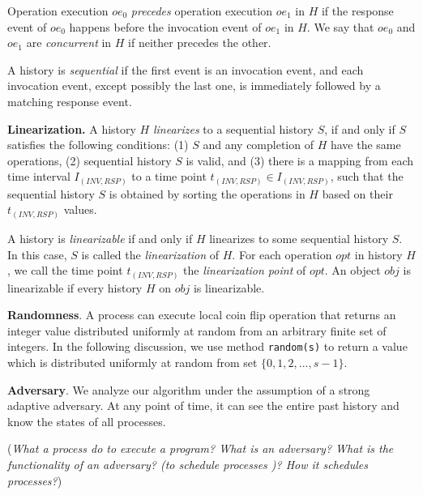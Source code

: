 Operation execution $oe_0$ \emph{precedes} operation execution $oe_1$ in $H$ if the response event of
$oe_0$ happens before the invocation event of $oe_1$ in $H$.
We say that $oe_0$ and $oe_1$ are \emph{concurrent} in $H$ if neither precedes the other.

A history is \emph{sequential} if the first event is an invocation event, and each invocation event, except
possibly the last one, is immediately followed by a matching response event.

\textbf{Linearization.}
A history $H$ \emph{linearizes} to a sequential history $S$, if and only if $S$ satisfies the
following conditions: (1) $S$ and any completion of $H$ have the same operations, (2) sequential history $S$ is
valid, and (3) there is a mapping from each time interval $I_{(INV, RSP)}$ to a time point $t_{(INV, RSP)} \in I_{(INV, RSP)}$, such
that the sequential history $S$ is obtained by sorting the operations in $H$ based on their $t_{(INV, RSP)}$ values.

A history is \emph{linearizable} if and only if $H$ linearizes to some sequential history $S$. In this case,
$S$ is called the \emph{linearization} of $H$. For each operation $opt$ in history $H$, we call the time point $t_{(INV, RSP)}$
the \emph{linearization point} of $opt$. An object $obj$ is linearizable if every history $H$ on $obj$ is linearizable.

\textbf{Randomness}.
A process can execute local coin flip operation that returns an integer value distributed
uniformly at random from an arbitrary finite set of integers. In the following discussion, we use method
\texttt{random(s)} to return a value which is distributed uniformly at random from set $\{0, 1, 2,..., s-1\}$.

\textbf{Adversary}.
We analyze our algorithm under the assumption of a strong adaptive adversary. At any
point of time, it can see the entire past history and know the states of all processes.

(\emph{What a process do to execute a program? What is an adversary? What is the functionality of an adversary? (to schedule processes )?
How it schedules processes?})


